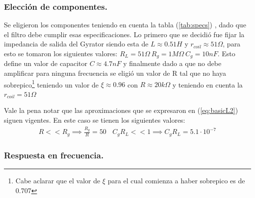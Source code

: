 \subsubsection{Elección de componentes.}
Se eligieron los componentes teniendo en cuenta la tabla (\ref{tab:specs}) , dado que el filtro debe cumplir esas especificaciones.
Lo primero que se decidió fue fijar la impedancia de salida del Gyrator siendo esta de $L \approx 0.51H $ y $r_{coil} \approx 51\Omega $, para esto se tomaron los siguientes valores: $R_L = 51\Omega \ R_g = 1M\Omega \ C_g = 10nF$.
 Esto define un valor de capacitor $C \approx 4.7nF$ y finalmente dado a que no debe amplificar para ninguna frecuencia se eligió un valor de R tal que no haya sobrepico\footnote{Cabe aclarar que el valor de $\xi$ para el cual comienza a haber sobrepico es de 0.707} teniendo un valor de $\xi \approx 0.96 $ con $R \approx 20k\Omega $ y teniendo en cuenta la $r_{coil} = 51\Omega$  

Vale la pena notar que las aproximaciones que se expresaron en (\ref{eq:basicL2}) siguen vigentes. En este caso se tienen los siguientes valores:
\begin{align}  R<<R_g \implies  \frac{R_g}{R}=  50 \ \ \ \ C_gR_L << 1 \implies C_gR_L =5.1 \cdot 10^{-7} \end{align}

\subsubsection{Respuesta en frecuencia.}

